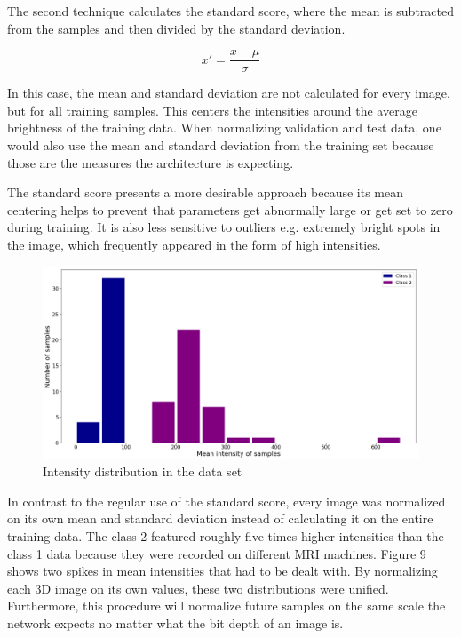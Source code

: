 The second technique calculates the standard score, where the mean is subtracted from the samples and then divided by the standard deviation.

\begin{figure}[H]
\[x' = \frac {x - \mu}{\sigma}\]
\end{figure}

In this case, the mean and standard deviation are not calculated for every image, but for all training samples. This centers the intensities around the average brightness of the training data. When normalizing validation and test data, one would also use the mean and standard deviation from the training set because those are the measures the architecture is expecting.

The standard score presents a more desirable approach because its mean centering helps to prevent that parameters get abnormally large or get set to zero during training. It is also less sensitive to outliers e.g. extremely bright spots in the image, which frequently appeared in the form of high intensities.

\begin{figure}[H]
\centering
\par
\includegraphics[width=1.0\textwidth]{imgs/intensity_distr.png}
\caption{Intensity distribution in the data set}
\par
\end{figure}

In contrast to the regular use of the standard score, every image was normalized on its own mean and standard deviation instead of calculating it on the entire training data. The class 2 featured roughly five times higher intensities than the class 1 data because they were recorded on different MRI machines. Figure 9 shows two spikes in mean intensities that had to be dealt with. By normalizing each 3D image on its own values, these two distributions were unified. Furthermore, this procedure will normalize future samples on the same scale the network expects no matter what the bit depth of an image is.

